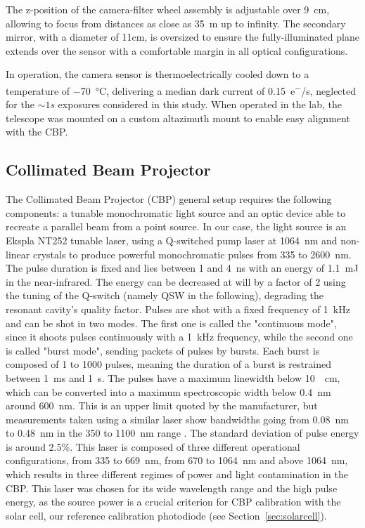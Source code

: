 The z-position of the camera-filter wheel assembly is adjustable over \SI{9}{\centi\meter}, allowing to focus from distances as close as \SI{35}{m} up to infinity. The secondary mirror, with a diameter of 11cm, is oversized to ensure the fully-illuminated plane extends over the sensor with a comfortable margin in all optical configurations.

In operation, the camera sensor is thermoelectrically cooled down to a temperature of \SI{-70}{\celsius}, delivering a median dark current of \SI{0.15}{e^-/s}, neglected for the $\sim 1s$ exposures considered in this study. When operated in the lab, the telescope was mounted on a custom altazimuth mount to enable easy alignment with the CBP.

\subsection{Collimated Beam Projector}
\label{sec:cbp}

The Collimated Beam Projector (CBP) general setup requires the following components: a tunable monochromatic light source and an optic device able to recreate a parallel beam from a point source. In our case, the light source is an Ekspla NT252 tunable laser, using a Q-switched pump laser at \SI{1064}{\nano\meter} and non-linear crystals to produce powerful monochromatic pulses from 335 to \SI{2600}{\nano\meter}. The pulse duration is fixed and lies between 1 and \SI{4}{\nano\second} with an energy of \SI{1.1}{\milli\joule} in the near-infrared. The energy can be decreased at will by a factor of 2 using the tuning of the Q-switch (namely QSW in the following), degrading the resonant cavity's quality factor. Pulses are shot with a fixed frequency of \SI{1}{\kilo\hertz} and can be shot in two modes. The first one is called the "continuous mode", since it shoots pulses continuously with a \SI{1}{\kilo\hertz} frequency, while the second one is called "burst mode", sending packets of pulses by bursts. Each burst is composed of 1 to 1000 pulses, meaning the duration of a burst is restrained between \SI{1}{\milli\second} and \SI{1}{\second}. The pulses have a maximum linewidth below \SI{10}{\per\cm}, which can be converted into a maximum spectroscopic width below \SI{0.4}{\nano\meter} around \SI{600}{\nano\meter}. This is an upper limit quoted by the manufacturer, but measurements taken using a similar laser show bandwidths going from \SI{0.08}{\nm} to \SI{0.48}{\nm} in the 350 to \SI{1100}{\nm} range \citep{woodward2018}. The standard deviation of pulse energy is around 2.5\%. This laser is composed of three different operational configurations, from 335 to \SI{669}{\nano\meter}, from 670 to \SI{1064}{\nano\meter} and above \SI{1064}{\nano\meter}, which results in three different regimes of power and light contamination in the CBP. This laser was chosen for its wide wavelength range and the high pulse energy, as the source power is a crucial criterion for CBP calibration with the solar cell, our reference calibration photodiode (see Section~\ref{sec:solarcell}). 

